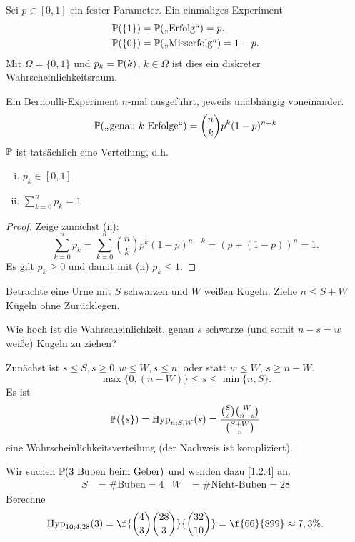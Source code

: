 \begin{ex} \label{1.2.2}
	Sei $p \in [0,1]$ ein fester Parameter.
	Ein einmaliges Experiment
	\begin{align*}
		\P(\{1\}) &= \P(\text{„Erfolg“}) = p. \\
		\P(\{0\}) &= \P(\text{„Misserfolg“}) = 1 -p.
	\end{align*}
	Mit $\Omega = \{0,1\}$ und $p_k = \P({k})$, $k \in \Omega$ ist dies ein diskreter Wahrscheinlichkeitsraum.
\end{ex}

\begin{ex} \label{1.2.3}
	Ein Bernoulli-Experiment $n$-mal ausgeführt, jeweils unabhängig voneinander.
	\begin{align*}
		\P(\text{„genau $k$ Erfolge“}) = \binom{n}{k} p^k (1-p)^{n-k}
	\end{align*}
	$\P$ ist tatsächlich eine Verteilung, d.h.
	\begin{enumerate}[(i)]
		\item
			$p_k \in [0,1]$
		\item
			$\sum_{k=0}^n p_k = 1$
	\end{enumerate}
	\begin{proof}
		Zeige zunächst (ii):
		\[
			\sum_{k=0}^n p_k
			= \sum_{k=0}^n \binom{n}{k} p^k (1-p)^{n-k}
			= (p + (1-p))^n
			= 1.
		\]
		Es gilt $p_k \ge 0$ und damit mit (ii) $p_k \le 1$.
	\end{proof}
\end{ex}

\begin{ex} \label{1.2.4}
	Betrachte eine Urne mit $S$ schwarzen und $W$ weißen Kugeln.
	Ziehe $n \le S + W$ Kügeln ohne Zurücklegen.

	Wie hoch ist die Wahrscheinlichkeit, genau $s$ schwarze (und somit $n-s =w$ weiße) Kugeln zu ziehen?

	Zunächst ist $s \le S, s \ge 0, w \le W, s \le n$, oder statt $w \le W$, $s \ge n - W$.
	\[
		\max \{0, (n-W)\} \le s \le \min\{ n, S \}.
	\]
	Es ist
	\[
		\P(\{s\})
		= \Hyp_{n;S,W}(s)
		= \dfrac {\binom{S}{s} \binom{W}{n-s}}{\binom{S+W}{n}}
	\]
	eine Wahrscheinlichkeitsverteilung (der Nachweis ist kompliziert).
\end{ex}

\begin{ex*}[Skat]
	Wir suchen $\P(\text{3 Buben beim Geber})$ und wenden dazu \ref{1.2.4} an.
	\begin{align*}
		S &= \#\text{Buben} = 4 &
		W &= \#\text{Nicht-Buben} = 28
	\end{align*}
	Berechne
	\[
		\Hyp_{10;4,28}(3)
		= \f {\binom 43 \binom{28}{3}}{\binom {32}{10}} = \f {66}{899} \approx 7,3\%.
	\]
\end{ex*}

